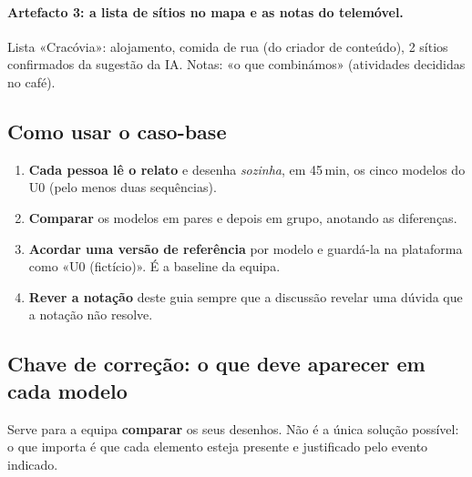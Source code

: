 \documentclass[11pt,a4paper]{article}
\begin{document}
\paragraph{Artefacto 3: a lista de sítios no mapa e as notas do telemóvel.} Lista «Cracóvia»: alojamento, comida de rua (do criador de conteúdo), 2 sítios confirmados da sugestão da IA. Notas: «o que combinámos» (atividades decididas no café).

\subsection{Como usar o caso-base}

\begin{enumerate}
  \item \textbf{Cada pessoa lê o relato} e desenha \emph{sozinha}, em 45\,min, os cinco modelos do U0 (pelo menos duas sequências).
  \item \textbf{Comparar} os modelos em pares e depois em grupo, anotando as diferenças.
  \item \textbf{Acordar uma versão de referência} por modelo e guardá-la na plataforma como «U0 (fictício)». É a baseline da equipa.
  \item \textbf{Rever a notação} deste guia sempre que a discussão revelar uma dúvida que a notação não resolve.
\end{enumerate}

\subsection{Chave de correção: o que deve aparecer em cada modelo}

Serve para a equipa \textbf{comparar} os seus desenhos. Não é a única solução possível: o que importa é que cada elemento esteja presente e justificado pelo evento indicado.
\end{document}
